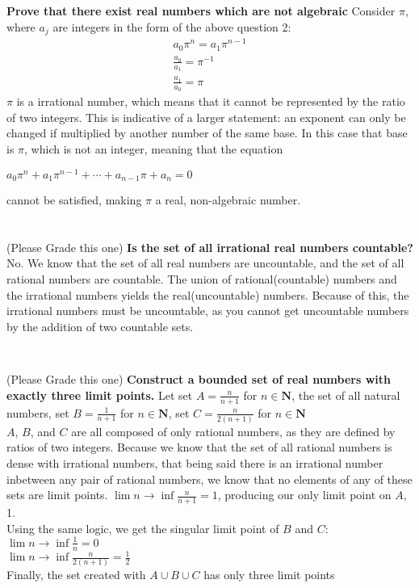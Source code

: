 \documentclass{article}
\begin{document}
\section{}
\noindent \textbf{Prove that there exist real numbers which are not algebraic}
Consider $\pi$, where $a_j$ are integers in the form of the above question 2:
\begin{align*}
    a_0 \pi^n = a_1\pi^{n-1}\\
    \frac{a_0}{a_1} = \pi^{-1} \\
    \frac{a_1}{a_0} = \pi
\end{align*}
$\pi$ is a irrational number, which means that it cannot be represented by the ratio of two integers. This is indicative of a larger statement: an exponent can only be changed if multiplied by another number of the same base. In this case
that base is $\pi$, which is not an integer, meaning that the equation \begin{center}
    $a_0\pi^n + a_1\pi^{n-1} + \cdots + a_{n-1}\pi + a_n = 0$
\end{center}
cannot be satisfied, making $\pi$ a real, non-algebraic number.
\section{} (Please Grade this one)
\noindent \textbf{Is the set of all irrational real numbers countable?} 
No. We know that the set of all real numbers are uncountable, and the set of all rational numbers are countable. The union of rational(countable) numbers and the irrational numbers 
yields the real(uncountable) numbers. Because of this, the irrational numbers must be uncountable, as you cannot get uncountable numbers by the addition of two countable sets. 
\begin{align*}
\end{align*}

\section{} (Please Grade this one)
\noindent \textbf{Construct a bounded set of real numbers with exactly three limit points.}
Let set $A = \frac{n}{n+1}$ for $n \in \mathbf{N}$, the set of all natural numbers, set $B = \frac{1}{n + 1}$ for $n \in {\mathbf{N}}$, set $C = \frac{n}{2(n+1)}$ for $n \in \mathbf{N}$\\
$A$, $B$, and $C$ are all composed of only rational numbers, as they are defined by ratios of two integers. Because we know that the set of all rational numbers is dense with irrational numbers, that being said there is an irrational number inbetween any pair of rational numbers, we know that no 
elements of any of these sets are limit points. $\lim{n \to \inf}\frac{n}{n+1} = 1$, producing our only limit point on $A$, 1.\\
Using the same logic, we get the singular limit point of $B$ and $C$:\\ 
$\lim{n \to \inf}\frac{1}{n} = 0$\\
$\lim{n \to \inf}\frac{n}{2(n+1)} = \frac{1}{2}$\\
Finally, the set created with $A \cup B \cup C$ has only three limit points
\end{document}
